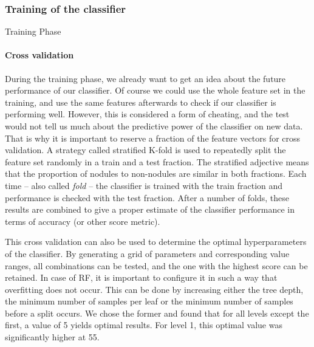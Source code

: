 \subsubsection{Training of the classifier}
\begin{algorithm}[H]
	\DontPrintSemicolon
	\caption{Training Phase\label{alg:train}}
\end{algorithm}

\paragraph{Cross validation}
During the training phase, we already want to get an idea about the future
performance of our classifier. Of course we could use the whole feature set in
the training, and use the same features afterwards to check if our classifier is
performing well. However, this is considered a form of cheating, and the test
would not tell us much about the predictive power of the classifier on new data.
That is why it is important to reserve a fraction of the feature vectors for
cross validation. A strategy called stratified K-fold is used to repeatedly
split the feature set randomly in a train and a test fraction.
The stratified adjective means that the proportion of nodules to non-nodules are
similar in both fractions. Each time -- also called \textit{fold} -- the
classifier is trained with the train fraction and performance is checked with
the test fraction. After a number of folds, these results are combined to give a
proper estimate of the classifier performance in terms of accuracy (or other
score metric).

This cross validation can also be used to determine the optimal hyperparameters
of the classifier. By generating a grid of parameters and corresponding value
ranges, all combinations can be tested, and the one with the highest score can
be retained. In case of RF, it is important to configure it in such a way that
overfitting does not occur. This can be done by increasing either the tree
depth, the minimum number of samples per leaf or the minimum number of samples
before a split occurs. We chose the former and found that for all levels except
the first, a value of 5 yields optimal results. For level 1, this optimal value
was significantly higher at 55. %

